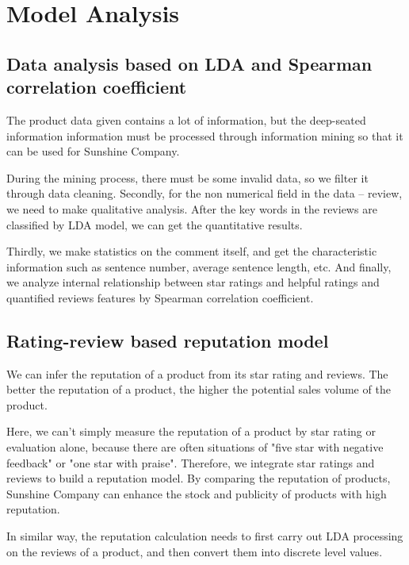 \documentclass{mcmthesis}
\begin{document}

\section{Model Analysis}
\subsection{Data analysis based on LDA and Spearman correlation coefficient}
The product data given contains a lot of information, but the deep-seated information information must be processed through information mining so that it can be used for Sunshine Company. 

During the mining process, there must be some invalid data, so we filter it through data cleaning. Secondly, for the non numerical field in the data -- review, we need to make qualitative analysis. After the key words in the reviews are classified by LDA model\cite{blei2003latent}, we can get the quantitative results. 

Thirdly, we make statistics on the comment itself, and get the characteristic information such as sentence number, average sentence length, etc. And finally, we analyze internal relationship between star ratings and helpful ratings and quantified reviews features by Spearman correlation coefficient\cite{myers2004spearman}.

\subsection{Rating-review based reputation model}
\indent We can infer the reputation of a product from its star rating and reviews. The better the reputation of a product, the higher the potential sales volume of the product. 

Here, we can't simply measure the reputation of a product by star rating or evaluation alone, because there are often situations of "five star with negative feedback" or "one star with praise". Therefore, we integrate star ratings and reviews to build a reputation model. By comparing the reputation of products, Sunshine Company can enhance the stock and publicity of products with high reputation.

In similar way, the reputation calculation needs to first carry out LDA processing on the reviews of a product, and then convert them into discrete level values. 
\end{document}
